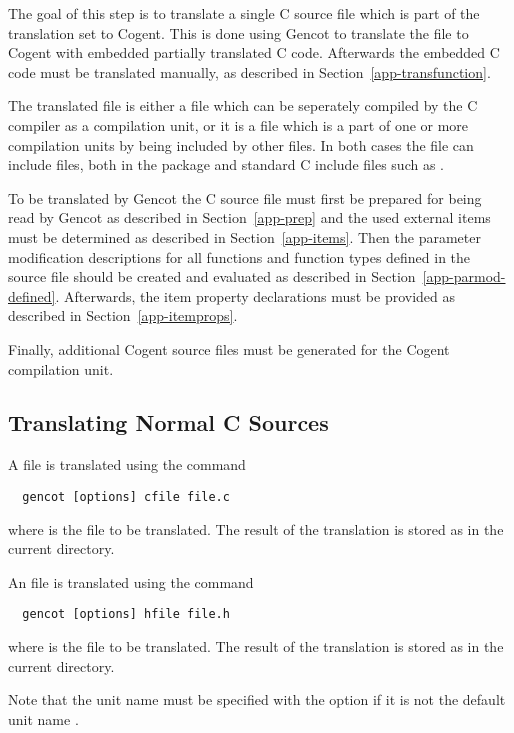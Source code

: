The goal of this step is to translate a single C source file which is part of the translation set to Cogent.
This is done using Gencot to translate the file to Cogent with embedded partially translated C code.
Afterwards the embedded C code must be translated manually, as described in Section~\ref{app-transfunction}.

The translated file is either a  file which can be seperately compiled by the C compiler as a compilation unit,
or it is a  file which is a part of one or more compilation units by being included by other files. In both cases
the file can include  files, both in the package and standard C include files such as .

To be translated by Gencot the C source file must first be prepared for being read by Gencot as described in
Section~\ref{app-prep} and the used external items must be determined as described in Section~\ref{app-items}.
Then the parameter modification descriptions for all functions and function types defined 
in the source file should be created and evaluated as described in Section~\ref{app-parmod-defined}. Afterwards,
the item property declarations must be provided as described in Section~\ref{app-itemprops}.

Finally, additional Cogent source files must be generated for the Cogent compilation unit.

\subsection{Translating Normal C Sources}
\label{app-transauto-normal}

A  file is translated using the command
\begin{verbatim}
  gencot [options] cfile file.c
\end{verbatim}
where  is the file to be translated. The result of the translation is stored as  
in the current directory.

An  file is translated using the command
\begin{verbatim}
  gencot [options] hfile file.h
\end{verbatim}
where  is the file to be translated. The result of the translation is 
stored as  in the current directory.

Note that the unit name must be specified with the  option if it is not the default unit name .

